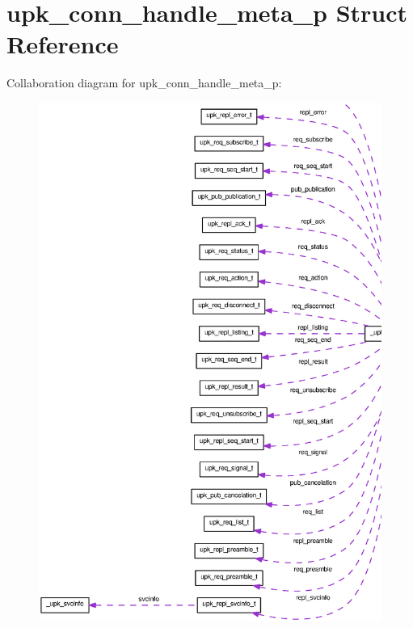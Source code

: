 \section{upk\_\-conn\_\-handle\_\-meta\_\-p Struct Reference}
\label{structupk__conn__handle__meta__p}


Collaboration diagram for upk\_\-conn\_\-handle\_\-meta\_\-p:
\nopagebreak
\begin{figure}[H]
\begin{center}
\leavevmode
\includegraphics[width=400pt]{structupk__conn__handle__meta__p__coll__graph}
\end{center}
\end{figure}

